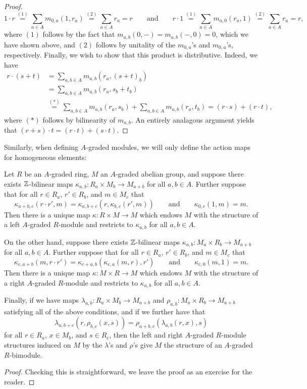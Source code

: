 \documentclass[../main.tex]{subfiles}
\begin{document}
\begin{proof}
	\[1\cdot r\overset{(1)}=\sum_{a\in A}m_{0,a}(1,r_a)\overset{(2)}=\sum_{a\in A}r_a=r\qquad\text{and}\qquad r\cdot 1\overset{(1)}=\sum_{a\in A}m_{a,0}(r_a,1)\overset{(2)}=\sum_{a\in A}r_a=r,\]
	where $(1)$ follows by the fact that $m_{a,b}(0,-)=m_{a,b}(-,0)=0$, which we have shown above, and $(2)$ follows by unitality of the $m_{0,a}$'s and $m_{0,a}$'s, respectively. Finally, we wish to show that this product is distributive. Indeed, we have
	\begin{align*}
		r\cdot(s+t)&=\sum_{a,b\in A}m_{a,b}(r_a,(s+t)_b) \\
		&=\sum_{a,b\in A}m_{a,b}(r_a,s_b+t_b) \\
		&\overset{(*)}=\sum_{a,b\in A}m_{a,b}(r_a,s_b)+\sum_{a,b\in A}m_{a,b}(r_a,t_b)=(r\cdot s)+(r\cdot t),
	\end{align*}
	where $(*)$ follows by bilinearity of $m_{a,b}$. An entirely analagous argument yields that $(r+s)\cdot t=(r\cdot t)+(s\cdot t)$.
\end{proof}

Similarly, when defining $A$-graded modules, we will only define the action maps for homogeneous elements:

\begin{lemma}\label{A-graded_module}
	Let $R$ be an $A$-graded ring, $M$ an $A$-graded abelian group, and suppose there exists $\mathbb{Z}$-bilinear maps $\kappa_{a,b}:R_a\times M_b\to M_{a+b}$ for all $a,b\in A$. Further suppose that for all $r\in R_a$, $r'\in R_b$, and $m\in M_c$ that
	\[\kappa_{a+b,c}(r\cdot r',m)=\kappa_{a,b+c}(r,\kappa_{b,c}(r',m))\qquad\text{and}\qquad\kappa_{0,c}(1,m)=m.\]
	Then there is a unique map $\kappa:R\times M\to M$ which endows $M$ with the structure of a left $A$-graded $R$-module and restricts to $\kappa_{a,b}$ for all $a,b\in A$.

	On the other hand, suppose there exists $\mathbb{Z}$-bilinear maps $\kappa_{a,b}:M_a\times R_b\to M_{a+b}$ for all $a,b\in A$. Further suppose that for all $r\in R_a$, $r'\in R_b$, and $m\in M_c$ that
	\[\kappa_{c,a+b}(m,r\cdot r')=\kappa_{c+a,b}(\kappa_{c,a}(m,r),r')\qquad\text{and}\qquad\kappa_{c,0}(m,1)=m.\]
	Then there is a unique map $\kappa:M\times R\to M$ which endows $M$ with the structure of a right $A$-graded $R$-module and restricts to $\kappa_{a,b}$ for all $a,b\in A$.

	Finally, if we have maps $\lambda_{a,b}:R_a\times M_b\to M_{a+b}$ and $\rho_{a,b}:M_a\times R_b\to M_{a+b}$ satisfying all of the above conditions, and if we further have that
	\[\lambda_{a,b+c}(r,\rho_{b,c}(x,s))=\rho_{a+b,c}(\lambda_{a,b}(r,x),s)\]
	for all $r\in R_a$, $x\in M_b$, and $s\in R_c$, then the left and right $A$-graded $R$-module structures induced on $M$ by the $\lambda$'s and $\rho$'s give $M$ the structure of an $A$-graded $R$-bimodule.
\end{lemma}
\begin{proof}
	Checking this is straightforward, we leave the proof as an exercise for the reader.
\end{proof}
\end{document}

